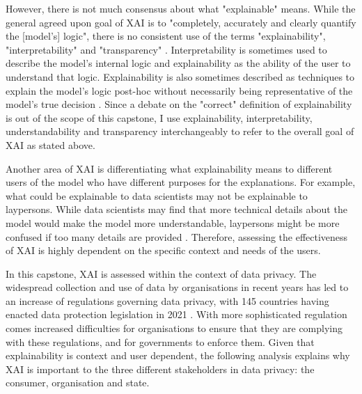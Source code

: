 However, there is not much consensus about what "explainable" means. While the general agreed upon goal of XAI is to "completely, accurately and clearly quantify the [model's] logic", there is no consistent use of the terms "explainability", "interpretability" and "transparency" \cite{danilevsky2020}. Interpretability is sometimes used to describe the model's internal logic and explainability as the ability of the user to understand that logic. Explainability is also sometimes described as techniques to explain the model's logic post-hoc without necessarily being representative of the model's true decision \cite{rosenfeld2021}. Since a debate on the "correct" definition of explainability is out of the scope of this capstone, I use explainability, interpretability, understandability and transparency interchangeably to refer to the overall goal of XAI as stated above.

Another area of XAI is differentiating what explainability means to different users of the model who have different purposes for the explanations. For example, what could be explainable to data scientists may not be explainable to laypersons. While data scientists may find that more technical details about the model would make the model more understandable, laypersons might be more confused if too many details are provided \cite{rosenfeld2021}. Therefore, assessing the effectiveness of XAI is highly dependent on the specific context and needs of the users. 

In this capstone, XAI is assessed within the context of data privacy. The widespread collection and use of data by organisations in recent years has led to an increase of regulations governing data privacy, with 145 countries having enacted data protection legislation in 2021 \cite{gstrein2022}. With more sophisticated regulation comes increased difficulties for organisations to ensure that they are complying with these regulations, and for governments to enforce them. Given that explainability is context and user dependent, the following analysis explains why XAI is important to the three different stakeholders in data privacy: the consumer, organisation and state.

